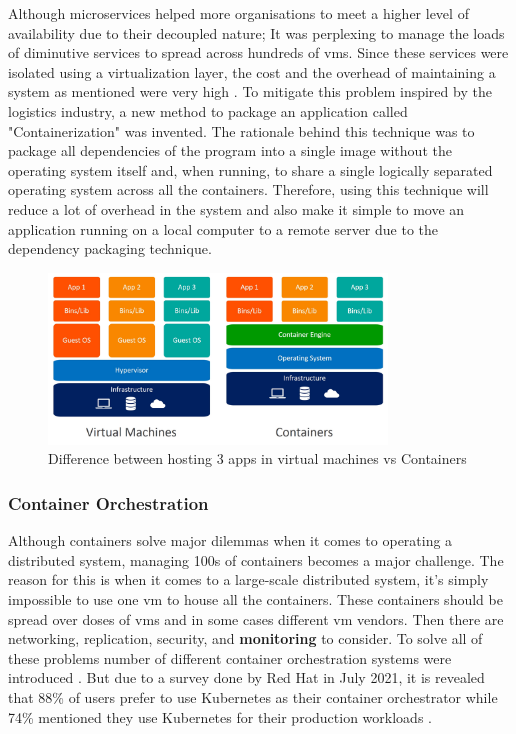Although microservices helped more organisations to meet a higher level of availability due to their decoupled nature; It was perplexing to manage the loads of diminutive services to spread across hundreds of \acp{vm}. Since these services were isolated using a virtualization layer, the cost and the overhead of maintaining a system as mentioned were very high \citep{dua2014virtualization}. To mitigate this problem inspired by the logistics industry, a new method to package an application called "Containerization" was invented. The rationale behind this technique was to package all dependencies of the program into a single image without the operating system itself and, when running, to share a single logically separated operating system across all the containers. Therefore, using this technique will reduce a lot of overhead in the system and also make it simple to move an application running on a local computer to a remote server due to the dependency packaging technique.

\begin{figure}[H]
    \includegraphics[width=9cm]{assets/literature-review/containers-vs-virtual-machines.jpg}
    \caption{Difference between hosting 3 apps in virtual machines vs Containers \citep{Dockervs91:online}}
\end{figure}

\subsubsection{Container Orchestration}

Although containers solve major dilemmas when it comes to operating a distributed system, managing 100s of containers becomes a major challenge. The reason for this is when it comes to a large-scale distributed system, it's simply impossible to use one \ac{vm} to house all the containers. These containers should be spread over doses of \acp{vm} and in some cases different \ac{vm} vendors. Then there are networking, replication, security, and \textbf{monitoring} to consider. To solve all of these problems number of different container orchestration systems were introduced \citep{ElasticityCloudComputing}. But due to a survey done by Red Hat in July 2021, it is revealed that 88\% of users prefer to use Kubernetes as their container orchestrator while 74\% mentioned they use Kubernetes for their production workloads \citep{Kubernet59:online}.

